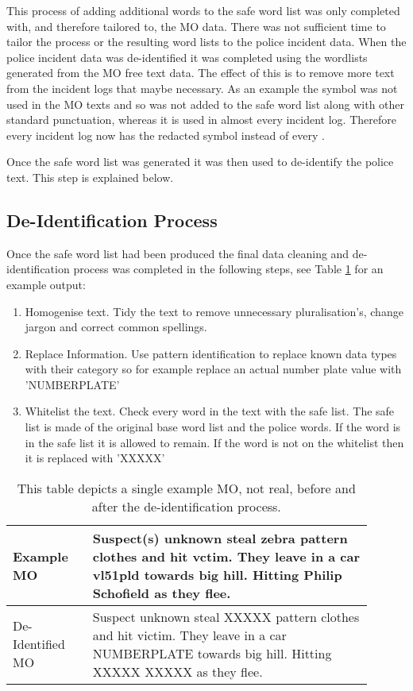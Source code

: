 This process of adding additional words to the safe word list was only completed with, and therefore tailored to, the MO data. There was not sufficient time to tailor the process or the resulting word lists to the police incident data. When the police incident data was de-identified it was completed using the wordlists generated from the MO free text data. The effect of this is to remove more text from the incident logs that maybe necessary. As an example the \say{:} symbol was not used in the MO texts and so was not added to the safe word list along with other standard punctuation, whereas it is used in almost every incident log. Therefore every incident log now has the redacted symbol  instead of every \say{:}.

Once the safe word list was generated it was then used to de-identify the police text. This step is explained below.


\subsection{De-Identification Process} Once the safe word list had been produced the final data cleaning and de-identification process was completed in the following steps, see Table \ref{Example_deident} for an example output:

\begin{enumerate}
    \item Homogenise text. Tidy the text to remove unnecessary pluralisation's, change jargon and correct common spellings.
    \item Replace Information. Use pattern identification to replace known data types with their category so for example replace an actual number plate value with 'NUMBERPLATE'
    \item Whitelist the text. Check every word in the text with the safe list. The safe list is made of the original base word list and the police words. If the word is in the safe list it is allowed to remain. If the word is not on the whitelist then it is replaced with 'XXXXX'
\end{enumerate}

\begin{table}[]
\centering
\begin{tabular}{p{0.2\linewidth}|p{0.7\linewidth}}
\toprule
Example MO       & Suspect(s) unknown steal zebra pattern clothes and hit vctim. They leave in a car vl51pld towards big hill. Hitting Philip Schofield as they flee. \\ \midrule
De-Identified MO & Suspect unknown steal XXXXX pattern clothes and hit victim. They leave in a car NUMBERPLATE towards big hill. Hitting XXXXX XXXXX as they flee.    \\ \bottomrule
\end{tabular}
\caption{\label{Example_deident} This table depicts a single example MO, not real, before and after the de-identification process.}
\end{table}


